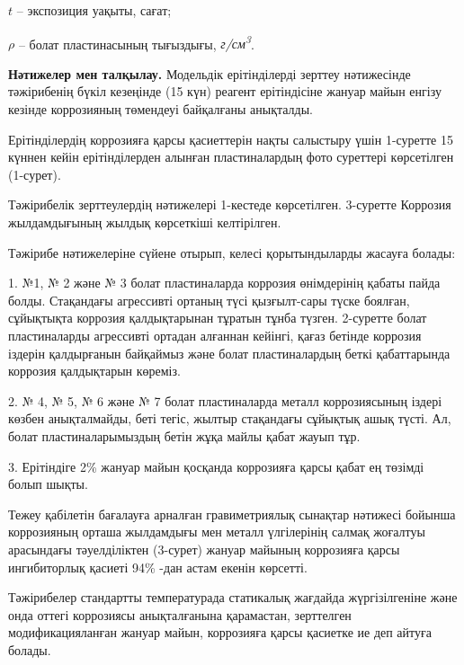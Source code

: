 \begin{multicols}{2}
\(t\) -- экспозиция уақыты, сағат;

\(\rho\) -- болат пластинасының тығыздығы,
\emph{г/см\textsuperscript{3}}.

{\bfseries Нәтижелер мен талқылау.} Модельдік ерітінділерді зерттеу
нәтижесінде тәжірибенің бүкіл кезеңінде (15 күн) реагент ерітіндісіне
жануар майын енгізу кезінде коррозияның төмендеуі байқалғаны анықталды.

Ерітінділердің коррозияға қарсы қасиеттерін нақты салыстыру үшін
1-суретте 15 күннен кейін ерітінділерден алынған пластиналардың фото
суреттері көрсетілген (1-сурет). 

Тәжірибелік зерттеулердің нәтижелері 1-кестеде көрсетілген. 3-суретте
Коррозия жылдамдығының жылдық көрсеткіші келтірілген.

Тәжірибе нәтижелеріне сүйене отырып, келесі қорытындыларды жасауға
болады:

1. №1, № 2 және № 3 болат пластиналарда коррозия өнімдерінің қабаты
пайда болды. Стақандағы агрессивті ортаның түсі қызғылт-сары түске
боялған, сұйықтықта коррозия қалдықтарынан тұратын тұнба түзген.
2-суретте болат пластиналарды агрессивті ортадан алғаннан кейінгі, қағаз
бетінде коррозия іздерін қалдырғанын байқаймыз және болат пластиналардың
беткі қабаттарында коррозия қалдықтарын көреміз.

2. № 4, № 5, № 6 және № 7 болат пластиналарда металл коррозиясының
іздері көзбен анықталмайды, беті тегіс, жылтыр стақандағы сұйықтық ашық
түсті. Ал, болат пластиналарымыздың бетін жұқа майлы қабат жауып тұр.

3. Ерітіндіге 2\% жануар майын қосқанда коррозияға қарсы қабат ең
төзімді болып шықты.

Тежеу қабілетін бағалауға арналған гравиметриялық сынақтар нәтижесі
бойынша коррозияның орташа жылдамдығы мен металл үлгілерінің салмақ
жоғалтуы арасындағы тәуелділіктен (3-сурет) жануар майының коррозияға
қарсы ингибиторлық қасиеті 94\% -дан астам екенін көрсетті.

Тәжірибелер стандартты температурада статикалық жағдайда жүргізілгеніне
және онда оттегі коррозиясы анықталғанына қарамастан, зерттелген
модификацияланған жануар майын, коррозияға қарсы қасиетке ие деп айтуға
болады.

\end{multicols}
